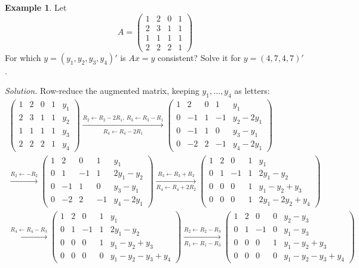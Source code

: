 \documentclass[12pt]{article}
\theoremstyle{definition}
\newtheorem{example}[theorem]{Example}
\begin{document}
\begin{example}\label{r2-exm-consistency}
Let
\[
A=\begin{pmatrix}1&2&0&1\\2&3&1&1\\1&1&1&1\\2&2&2&1\end{pmatrix}
\]
For which \(y=(y_1,y_2,y_3,y_4)'\) is \(Ax=y\) consistent? Solve it for \(y=(4,7,4,7)'\).

\textit{Solution.} Row-reduce the augmented matrix, keeping \(y_1,\dots,y_4\) as letters:
\[
\begin{gathered}
\left(\begin{array}{cccc|c}1&2&0&1&y_1\\2&3&1&1&y_2\\1&1&1&1&y_3\\2&2&2&1&y_4\end{array}\right)
\xrightarrow[R_4\leftarrow R_4-2R_1]{R_2\leftarrow R_2-2R_1,\ R_3\leftarrow R_3-R_1}
\left(\begin{array}{cccc|c}1&2&0&1&y_1\\0&-1&1&-1&y_2-2y_1\\0&-1&1&0&y_3-y_1\\0&-2&2&-1&y_4-2y_1\end{array}\right)
\\
\xrightarrow{R_2\leftarrow-R_2}
\left(\begin{array}{cccc|c}1&2&0&1&y_1\\0&1&-1&1&2y_1-y_2\\0&-1&1&0&y_3-y_1\\0&-2&2&-1&y_4-2y_1\end{array}\right)
\xrightarrow[R_4\leftarrow R_4+2R_2]{R_3\leftarrow R_3+R_2}
\left(\begin{array}{cccc|c}1&2&0&1&y_1\\0&1&-1&1&2y_1-y_2\\0&0&0&1&y_1-y_2+y_3\\0&0&0&1&2y_1-2y_2+y_4\end{array}\right)
\\
\xrightarrow{R_4\leftarrow R_4-R_3}
\left(\begin{array}{cccc|c}1&2&0&1&y_1\\0&1&-1&1&2y_1-y_2\\0&0&0&1&y_1-y_2+y_3\\0&0&0&0&y_1-y_2-y_3+y_4\end{array}\right)
\xrightarrow[R_1\leftarrow R_1-R_3]{R_2\leftarrow R_2-R_3}
\left(\begin{array}{cccc|c}1&2&0&0&y_2-y_3\\0&1&-1&0&y_1-y_3\\0&0&0&1&y_1-y_2+y_3\\0&0&0&0&y_1-y_2-y_3+y_4\end{array}\right)

\end{gathered}\]
\end{example}
\end{document}
